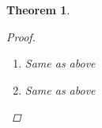 \documentclass{article}
\newcommand{\lra}{\longrightarrow}
\newtheorem{theorem}{Theorem}
\begin{document}
\begin{theorem}
\begin{proof}
\begin{enumerate}
\begin{enumerate}
                        Therefore there exists a run $\rho_{A\pm1}$ on $r$, and it is:

                        \begin{equation*}
                            \rho_{A\pm 1} = f(q_0) \overset{c_1}{\lra} f(\phi_1) \cdot\cdot\cdot f(\phi_i) \overset{c_{ins}}{\lra} f'(\phi_i) \overset{c_i}{\lra} f'(\phi_{i + 1})  \cdot \cdot \cdot \overset{c_n}{\lra} f'(\phi_n)
                        \end{equation*}
                        \item Same as above
                        \item Same as above
                \end{enumerate}
        \end{enumerate}
    \end{proof}
\end{theorem}
\end{document}
